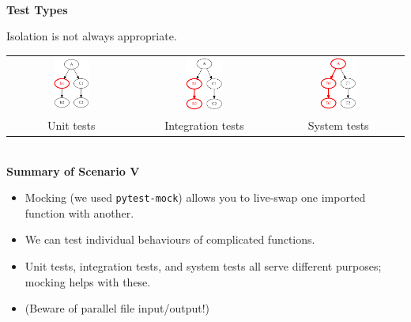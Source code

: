 \documentclass[12pt]{article}
\newcommand{\slidetitle}[1]{~\\[-0.5ex]{\Large\bf{\color{bold}#1}}\\}
\begin{document}
\slidetitle{Test Types}
\vfill
\centerline{Isolation is not always appropriate.}
\vfill
\begin{tabular}{ccc}
\includegraphics[width=0.3\textwidth]{unit.png} &
\includegraphics[width=0.3\textwidth]{integ.png} &
\includegraphics[width=0.3\textwidth]{sys.png} \\
Unit tests & Integration tests & System tests
\end{tabular}
\vfill
\vfill
\clearpage

\slidetitle{Summary of Scenario V}
\begin{itemize}
\item Mocking (we used \verb|pytest-mock|) allows you to live-swap one imported
    function with another.
\item We can test individual behaviours of complicated functions.
\item Unit tests, integration tests, and system tests all serve different
    purposes; mocking helps with these.
\item (Beware of parallel file input/output!)
\end{itemize}
\clearpage
\end{document}
